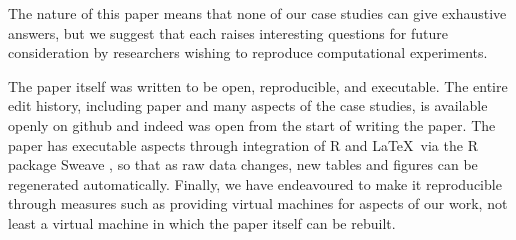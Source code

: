 The nature of this paper means that none of our case studies can give exhaustive answers, but we suggest that each raises interesting questions
for future consideration by researchers wishing to reproduce computational experiments.

The paper itself was written to be open, reproducible, and executable.  The entire edit history, including paper and many aspects of the case studies, is available openly on github and indeed was open from the start of writing the paper.  The paper has executable aspects through integration of R and \LaTeX\ via the R package Sweave \cite{sweave}, so that as raw data changes, new tables and figures can be regenerated automatically.
Finally, we have endeavoured to make it reproducible through measures such as providing virtual machines for aspects of our work, not least a virtual machine in which the paper itself can be rebuilt.






